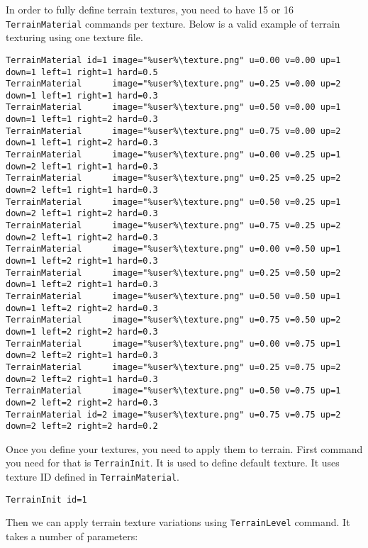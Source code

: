 In order to fully define terrain textures, you need to have 15 or 16 \texttt{TerrainMaterial} commands per texture. Below is a valid example of terrain texturing using one texture file.

\begin{lstlisting}[style=scene]
TerrainMaterial id=1 image="%user%\texture.png" u=0.00 v=0.00 up=1 down=1 left=1 right=1 hard=0.5
TerrainMaterial      image="%user%\texture.png" u=0.25 v=0.00 up=2 down=1 left=1 right=1 hard=0.3
TerrainMaterial      image="%user%\texture.png" u=0.50 v=0.00 up=1 down=1 left=1 right=2 hard=0.3
TerrainMaterial      image="%user%\texture.png" u=0.75 v=0.00 up=2 down=1 left=1 right=2 hard=0.3
TerrainMaterial      image="%user%\texture.png" u=0.00 v=0.25 up=1 down=2 left=1 right=1 hard=0.3
TerrainMaterial      image="%user%\texture.png" u=0.25 v=0.25 up=2 down=2 left=1 right=1 hard=0.3
TerrainMaterial      image="%user%\texture.png" u=0.50 v=0.25 up=1 down=2 left=1 right=2 hard=0.3
TerrainMaterial      image="%user%\texture.png" u=0.75 v=0.25 up=2 down=2 left=1 right=2 hard=0.3
TerrainMaterial      image="%user%\texture.png" u=0.00 v=0.50 up=1 down=1 left=2 right=1 hard=0.3
TerrainMaterial      image="%user%\texture.png" u=0.25 v=0.50 up=2 down=1 left=2 right=1 hard=0.3
TerrainMaterial      image="%user%\texture.png" u=0.50 v=0.50 up=1 down=1 left=2 right=2 hard=0.3
TerrainMaterial      image="%user%\texture.png" u=0.75 v=0.50 up=2 down=1 left=2 right=2 hard=0.3
TerrainMaterial      image="%user%\texture.png" u=0.00 v=0.75 up=1 down=2 left=2 right=1 hard=0.3
TerrainMaterial      image="%user%\texture.png" u=0.25 v=0.75 up=2 down=2 left=2 right=1 hard=0.3
TerrainMaterial      image="%user%\texture.png" u=0.50 v=0.75 up=1 down=2 left=2 right=2 hard=0.3
TerrainMaterial id=2 image="%user%\texture.png" u=0.75 v=0.75 up=2 down=2 left=2 right=2 hard=0.2
\end{lstlisting}

Once you define your textures, you need to apply them to terrain. First command you need for that is \texttt{TerrainInit}. It is used to define default texture. It uses texture ID defined in \texttt{TerrainMaterial}.

\begin{lstlisting}[style=scene]
TerrainInit id=1
\end{lstlisting}

Then we can apply terrain texture variations using \texttt{TerrainLevel} command. It takes a number of parameters:

